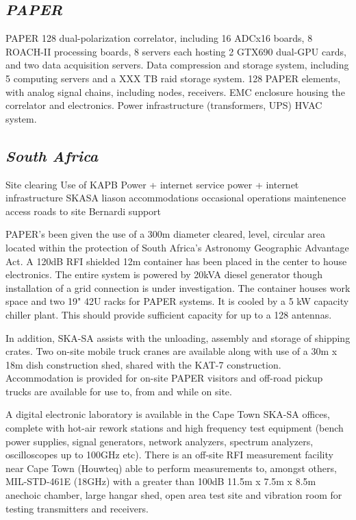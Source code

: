 \documentclass[11pt]{article}
\begin{document}
\subsection*{\it PAPER}

PAPER 128 dual-polarization correlator, including 16 ADCx16 boards, 
8 ROACH-II processing boards, 8 servers each hosting 2 GTX690 dual-GPU cards,
and two data acquisition servers.
Data compression and storage system, including 5 computing servers and 
a XXX TB raid storage system.
128 PAPER elements, with analog signal chains, including nodes, receivers.
EMC enclosure housing the correlator and electronics.
Power infrastructure (transformers, UPS)
HVAC system.

\subsection*{\it South Africa}

Site clearing
Use of KAPB
Power + internet service
power + internet infrastructure
SKASA liason
accommodations
occasional operations maintenence
access roads to site
Bernardi support


PAPER’s been given the use of a 300m diameter cleared, level, circular area
located within the protection of South Africa’s Astronomy Geographic Advantage
Act. A 120dB RFI shielded 12m container has been placed in the center to house
electronics. The entire system is powered by 20kVA diesel generator though
installation of a grid connection is under investigation. The container houses
work space and two 19" 42U racks for PAPER systems. It is cooled by a 5 kW
capacity chiller plant. This should provide sufficient capacity for up to a 128
antennas.

In addition, SKA-SA assists with the unloading, assembly and storage of
shipping crates. Two on-site mobile truck cranes are available along with use
of a 30m x 18m dish construction shed, shared with the KAT-7 construction.
Accommodation is provided for on-site PAPER visitors and off-road pickup trucks
are available for use to, from and while on site.

A digital electronic laboratory is available in the Cape Town SKA-SA offices,
complete with hot-air rework stations and high frequency test equipment
(bench power supplies, signal generators, network analyzers, spectrum
analyzers, oscilloscopes up to 100GHz etc). There is an off-site RFI
measurement facility near Cape Town (Houwteq) able to perform measurements to,
amongst others, MIL-STD-461E (18GHz) with a greater than 100dB 11.5m x 7.5m x
8.5m anechoic chamber, large hangar shed, open area test site and vibration
room for testing transmitters and receivers.
\end{document}
